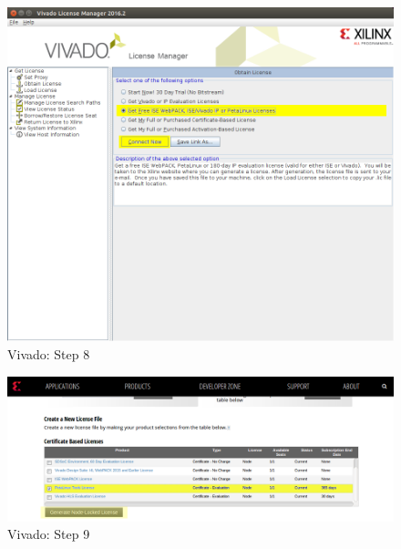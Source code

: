 \begin{figure}
    \centering
    \includegraphics[width=1\textwidth,trim={0 10cm 0 0cm},clip]{images/devguide/vivado-install-11.png}
    \caption[Vivado: Step 8]{%
        Vivado: Step 8
    }
    \label{fig:devguide:vivado8}
\end{figure}

\begin{figure}
    \centering
    \includegraphics[width=1\textwidth]{images/devguide/vivado-install-12.png}
    \caption[Vivado: Step 9]{%
        Vivado: Step 9
    }
    \label{fig:devguide:vivado9}
\end{figure}

